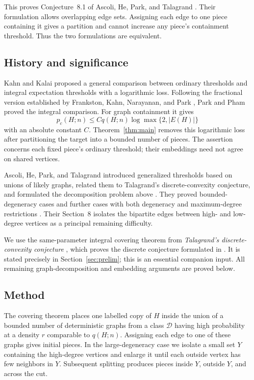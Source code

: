 \documentclass[11pt]{article}
\theoremstyle{remark}
\numberwithin{equation}{section}
\newcommand{\calD}{\mathcal D}
\begin{document}
This proves Conjecture~8.1 of Ascoli, He, Park, and Talagrand
\cite{AHPT26}. Their formulation allows overlapping edge sets.
Assigning each edge to one piece containing it gives a partition
and cannot increase any piece's containment threshold. Thus the
two formulations are equivalent.

\subsection*{History and significance}
Kahn and Kalai \cite{KK07} proposed a general comparison between
ordinary thresholds and integral expectation thresholds with a
logarithmic loss. Following the fractional version established by
Frankston, Kahn, Narayanan, and Park \cite{FKNP21}, Park and Pham
\cite{PP24} proved the integral comparison. For graph containment
it gives
\[
 p_c(H;n)\leq Cq(H;n)\log\max\{2,|E(H)|\}
\]
with an absolute constant $C$. Theorem~\ref{thm:main} removes
this logarithmic loss after partitioning the target into a bounded
number of pieces. The assertion concerns each fixed piece's
ordinary threshold; their embeddings need not agree on shared
vertices.

Ascoli, He, Park, and Talagrand introduced generalized thresholds
based on unions of likely graphs, related them to Talagrand's
discrete-convexity conjecture, and formulated the decomposition
problem above \cite{AHPT26}. They proved bounded-degeneracy
cases and further cases with both degeneracy and maximum-degree
restrictions \cite[Theorems~1.12--1.13]{AHPT26}. Their
Section~8 isolates the bipartite edges between high- and
low-degree vertices as a principal remaining difficulty.

We use the same-parameter integral covering theorem from
\emph{Talagrand's discrete-convexity conjecture}
\cite[Theorem~1.1]{OpenAI26DC}, which proves the discrete
conjecture formulated in \cite[Conjecture~7.1]{Talagrand10}.
It is stated precisely in Section~\ref{sec:prelim}; this is an
essential companion input. All remaining graph-decomposition and
embedding arguments are proved below.

\subsection*{Method}
The covering theorem places one labelled copy of $H$ inside the
union of a bounded number of deterministic graphs from a class
$\calD$ having high probability at a density $r$ comparable to
$q(H;n)$. Assigning each edge to one of these graphs gives initial
pieces. In the large-degeneracy case we isolate a small set $Y$
containing the high-degree vertices and enlarge it until each
outside vertex has few neighbors in $Y$. Subsequent splitting
produces pieces inside $Y$, outside $Y$, and across the cut.
\end{document}

